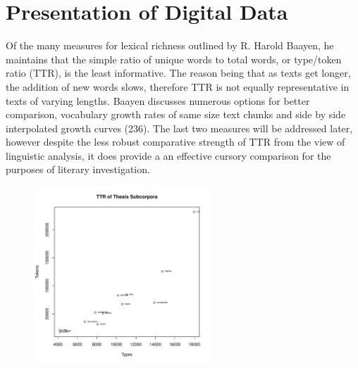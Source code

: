 \documentclass[12pt]{report}
\newenvironment{knitrout}{}{} %
\begin{document}
\section{Presentation of Digital Data}
Of the many measures for lexical richness outlined by R. Harold Baayen, he maintains that the simple ratio of unique words to total words, or type/token ratio (TTR), is the least informative. 
The reason being that as texts get longer, the addition of new words slows, therefore TTR is not equally representative in texts of varying lengths. 
Baayen discusses numerous options for better comparison, vocabulary growth rates of same size text chunks and side by side interpolated growth curves (236)\nocite{Baayen2008}.
The last two measures will be addressed later, however despite the less robust comparative strength of TTR from the view of linguistic analysis, it does provide a an effective cursory comparison for the purposes of literary investigation. 

\begin{figure}
	\caption{}
	\label{fig:TTR}
\begin{knitrout}
\color{fgcolor}
\includegraphics[width=250,height=250]{figure/TTR-1} 

\end{knitrout}
\end{figure} 
\end{document}
